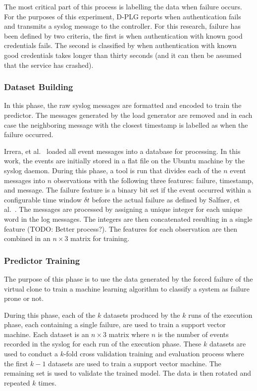 The most critical part of this process is labelling the data when failure
occurs.  For the purposes of this experiment, D-PLG reports when authentication
fails and transmits a syslog message to the controller.  For this research,
failure has been defined by two criteria, the first is when authentication with
known good credentials fails.  The second is classified by when authentication
with known good credentials takes longer than thirty seconds (and it can then
be assumed that the service has crashed).

\subsubsection{Dataset Building}
In this phase, the raw syslog messages are formatted and encoded to train the
predictor.  The messages generated by the load generator are removed and in
each case the neighboring message with the closest timestamp is labelled as
when the failure occurred.

Irrera, et al.~\cite{irrera2015} loaded all event messages into a database for
processing.  In this work, the events are initially stored in a flat file on
the Ubuntu machine by the syslog daemon.  During this phase, a tool is run that
divides each of the $n$ event messages into $n$ observations with the following
three features: failure, timestamp, and message.  The failure feature is a
binary bit set if the event occurred within a configurable time window $\delta
t$ before the actual failure as defined by Salfner, et
al.~\cite{salfnerSurvey}.  The messages are processed by assigning a unique
integer for each unique word in the log messages.  The integers are then
concatenated resulting in a single feature (TODO: Better process?).  The
features for each observation are then combined in an $n \times 3$ matrix for
training.

\subsubsection{Predictor Training}
The purpose of this phase is to use the data generated by the forced failure of
the virtual clone to train a machine learning algorithm to classify a system as
failure prone or not.  

During this phase, each of the $k$ datasets produced by the $k$ runs of the
execution phase, each containing a single failure, are used to train a support
vector machine.  Each dataset is an $n \times 3$ matrix where $n$ is the
number of events recorded in the syslog for each run of the execution phase.
These $k$ datasets are used to conduct a $k$-fold cross validation training
and evaluation process where the first $k - 1$ datasets are used to train a
support vector machine.  The remaining set is used to validate the trained
model.  The data is then rotated and repeated $k$ times.

